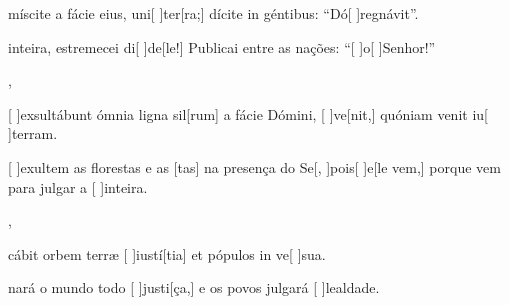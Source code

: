 {    {\item {}míscite a fácie eius, uni[ ]{ter}[ra;] dícite in géntibus: ``Dó[ ]{re}{gná}vit''.}%
        {\item {} inteira, estremecei di[ ]{de}[le!] Publicai entre as nações: ``[ ]{o}[ ]{Se}nhor!''},
    {\item {}[ ]{ex}sultábunt ómnia ligna sil[rum] a fácie Dómini, [ ]{ve}[nit,] quóniam venit iu[ ]{ter}ram.}%
        {\item {}[ ]{e}xultem as florestas e as [tas] na presença do Se[, ]{pois}[ ]{e}[le vem,] porque vem para julgar a [ ]{in}{tei}ra.},
    {\item {}cábit orbem terræ [ ]{iu}{stí}[tia] et pópulos in ve[ ]{su}a.}%
        {\item {}nará o mundo todo [ ]{jus}{ti}[ça,] e os povos julgará [ ]{le}{al}{da}de.}
}